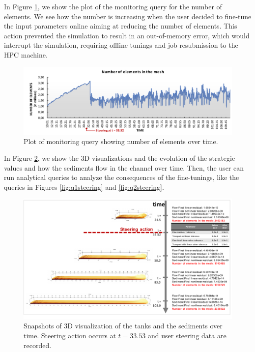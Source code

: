 In Figure \ref{fig:monitoring_plot}, we show the plot of the monitoring query for the number of
elements. We see how the number is increasing when the user decided to
fine-tune the input parameters online aiming at reducing the number of
elements. This action prevented the simulation to result in an
out-of-memory error, which would interrupt the simulation, requiring
offline tunings and job resubmission to the HPC machine.

\begin{figure}[H]
    \centering
    \includegraphics[width=\textwidth,keepaspectratio]{img/tuning-at-time.pdf}
    \caption{Plot of monitoring query showing number of elements over time.}
    \label{fig:monitoring_plot}
\end{figure}


 In Figure \ref{fig:largescale},
we show the 3D visualizations and the evolution of the strategic values
and how the sediments flow in the channel over time. Then, the user can
run analytical queries to analyze the consequences of the fine-tunings,
like the queries in Figures \ref{fig:q1steering} and \ref{fig:q2steering}.

\begin{figure}
    \centering
    \includegraphics[width=\textwidth,keepaspectratio]{img/large-scale.pdf}
    \caption{Snapshots of 3D visualization of the tanks and the sediments over time. Steering action occurs at $t = 33.53$ and user steering data are recorded.}
    \label{fig:largescale}
\end{figure}


